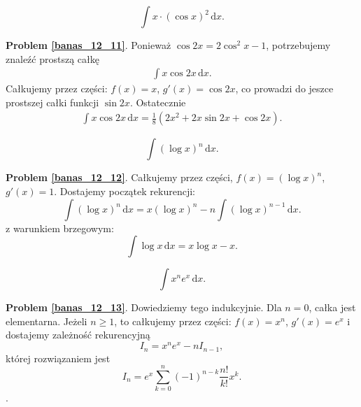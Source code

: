 \begin{problem_with_solution}
    \label{banas_12_11}%
    \begin{equation}
        \int x \cdot (\cos x)^2 \,\mathrm{d} x.
    \end{equation}
\end{problem_with_solution}

\textbf{Problem \ref{banas_12_11}}.
Ponieważ $\cos 2x = 2 \cos^2 x - 1$, potrzebujemy znaleźć prostszą całkę 
\begin{align}
    \int x \cos 2x \, \mathrm{d} x.
\end{align}
Całkujemy przez części: $f(x) = x$, $g'(x) = \cos 2x$, co prowadzi do jeszce prostszej całki funkcji $\sin 2x$.
Ostatecznie
\begin{align}
    \int x \cos 2x \, \mathrm{d} x = \frac 1 8 \left(2x^2 + 2x \sin 2x + \cos 2x\right).
\end{align}

\begin{problem_with_solution}
    \label{banas_12_12}%
    \begin{equation}
        \int (\log x)^n \,\mathrm{d}x.
    \end{equation}
\end{problem_with_solution}

\textbf{Problem \ref{banas_12_12}}.
Całkujemy przez części, $f(x) = (\log x)^n$, $g'(x) = 1$.
Dostajemy początek rekurencji:
\begin{equation}
    \int (\log x)^n \, \mathrm{d}x = x (\log x)^n - n \int (\log x)^{n-1} \,\mathrm{d} x.
\end{equation}
z warunkiem brzegowym:
\begin{equation}
    \int \log x\, \mathrm{d}x = x\log x - x.
\end{equation}

\begin{problem_with_solution}
    \label{banas_12_13}%
    \begin{equation}
        \int x^n e^x \,\mathrm{d} x.
    \end{equation}
\end{problem_with_solution}

\textbf{Problem \ref{banas_12_13}}.
Dowiedziemy tego indukcyjnie.
Dla $n = 0$, całka jest elementarna.
Jeżeli $n \ge 1$, to całkujemy przez części: $f(x) = x^n$, $g'(x) = e^x$ i dostajemy zależność rekurencyjną
\begin{equation}
    I_n = x^n e^x - nI_{n-1},
\end{equation}
której rozwiązaniem jest
\begin{equation}
    I_n = e^x \sum_{k=0}^n (-1)^{n-k} \frac{n!}{k!}x^k.
\end{equation}.

